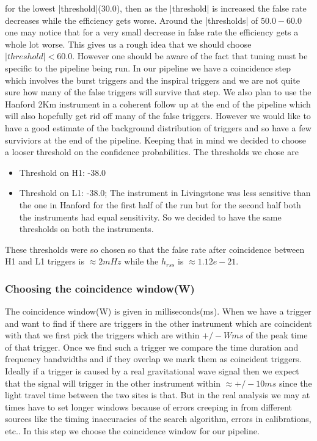 \documentclass{article}
\begin{document}
for the lowest |threshold|(30.0),  then as the |threshold| is increased
the false rate decreases while the efficiency gets worse. Around the 
|thresholds| of $50.0 - 60.0$ one may notice that for a very small 
decrease in false rate the efficiency gets a whole lot worse.  This gives 
us a rough idea that we should choose $ |threshold| < 60.0$.  However
one should be aware of the fact that tuning must be specific to the 
pipeline being run.  In our pipeline we have a coincidence step which
involves the burst triggers and the inspiral triggers and we are not
quite sure how many of the false triggers will survive that step. We
also plan to use the Hanford 2Km instrument in a coherent follow up at
the end of the pipeline which will also hopefully get rid off many of the
false triggers. However we would like to  
have a good estimate of the background distribution of triggers and so 
have a few surviviors at the end of the pipeline.  Keeping that 
in mind we decided to choose a looser threshold on the confidence 
probabilities. The thresholds we chose are 
\begin{itemize}
\item Threshold on H1: -38.0
\item Threshold on L1: -38.0; The instrument in Livingstone was less 
sensitive than the one in Hanford for the first half of the run but 
for the second half both the instruments had equal sensitivity.  So
we decided to have the same thresholds on both the instruments.
\end{itemize}      
These thresholds were so chosen so that the false rate after 
coincidence between H1 and L1 triggers is $\approx 2 mHz$ while 
the $ h_{rss}$ is $\approx 1.12e-21$.


\subsubsection{Choosing the coincidence window(W)}


The coincidence window(W) is given in milliseconds(ms).  When we 
have a trigger and want to find if there are triggers in the 
other instrument which are 
coincident with that we first pick the triggers which are within
$+/- W ms$ of the peak time of that trigger.  Once we find such a 
trigger we compare the time duration and frequency bandwidths and
if they overlap we mark them as coincident triggers. Ideally if a trigger 
is caused by a real gravitational wave signal then we expect that the
signal will trigger in the other instrument within $\approx +/- 10 ms$
since the light travel time between the two sites is that. But in the 
real analysis we may at times have to set longer windows because of 
errors creeping in from different sources like the timing inaccuracies 
of the search algorithm, errors in calibrations, etc..  In this step 
we choose the coincidence window for our pipeline.
\end{document}
